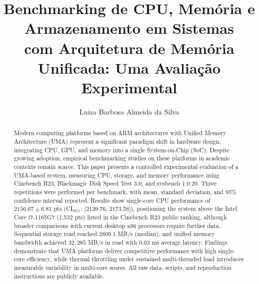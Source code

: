 \documentclass[12pt]{article}
\title{Benchmarking de CPU, Mem\'oria e Armazenamento em Sistemas\\
com Arquitetura de Mem\'oria Unificada: Uma Avalia\c{c}\~ao Experimental}
\author{Luiza Barbosa Almeida da Silva\inst{1}}
\begin{document}
\maketitle

\begin{abstract}
Modern computing platforms based on ARM architectures with Unified Memory
Architecture (UMA) represent a significant paradigm shift in hardware design,
integrating CPU, GPU, and memory into a single System-on-Chip (SoC). Despite
growing adoption, empirical benchmarking studies on these platforms in academic
contexts remain scarce. This paper presents a controlled experimental evaluation
of a UMA-based system, measuring CPU, storage, and memory performance using
Cinebench R23, Blackmagic Disk Speed Test 3.0, and sysbench 1.0.20. Three
repetitions were performed per benchmark, with mean, standard deviation, and
95\% confidence interval reported. Results show single-core CPU performance of
$2156.67 \pm 6.81$ pts (CI$_{95\%}$: [2139.76, 2173.58]), positioning the
system above the Intel Core i7-1165G7 (1,532 pts) listed in the Cinebench R23
public ranking, although broader comparisons with current desktop x86
processors require further data. Sequential storage read reached $2809.1$
MB/s (median), and unified memory
bandwidth achieved $32{,}285$ MB/s in read with $0.03$ ms average latency.
Findings demonstrate that UMA platforms deliver competitive performance with
high single-core efficiency, while thermal throttling under sustained
multi-threaded load introduces measurable variability in multi-core scores.
All raw data, scripts, and reproduction instructions are publicly available.
\end{abstract}
\end{document}
